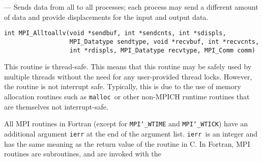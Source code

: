 \startmanpage
{}
--- Sends data from all to all processes; each process may  send a different amount of data and provide displacements for the input and output data. 
\startvb\begin{verbatim}
int MPI_Alltoallv(void *sendbuf, int *sendcnts, int *sdispls, 
                  MPI_Datatype sendtype, void *recvbuf, int *recvcnts, 
                  int *rdispls, MPI_Datatype recvtype, MPI_Comm comm)

\end{verbatim}
\endvb

\par
{}
\par
{}
\par
This routine is thread-safe.  This means that this routine may be
safely used by multiple threads without the need for any user-provided
thread locks.  However, the routine is not interrupt safe.  Typically,
this is due to the use of memory allocation routines such as {\tt malloc
}or other non-MPICH runtime routines that are themselves not interrupt-safe.
\par
{}
All MPI routines in Fortran (except for {\tt MPI{\tt \char`\_}WTIME} and {\tt MPI{\tt \char`\_}WTICK}) have
an additional argument {\tt ierr} at the end of the argument list.  {\tt ierr
}is an integer and has the same meaning as the return value of the routine
in C.  In Fortran, MPI routines are subroutines, and are invoked with the

